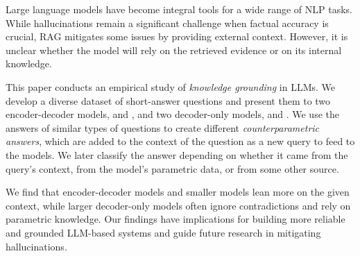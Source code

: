 Large language models have become integral tools for a wide range of NLP tasks.
While hallucinations remain a significant challenge when factual accuracy is crucial, RAG mitigates some issues by providing external context.
However, it is unclear whether the model will rely on the retrieved evidence or on its internal knowledge.

This paper conducts an empirical study of \emph{knowledge grounding} in LLMs.
We develop a diverse dataset of short-answer questions and present them to two encoder-decoder models, \smallflan{} and \bigflan{}, and two decoder-only models, \smallllama{} and \bigllama{}.
We use the answers of similar types of questions to create different \emph{counterparametric answers}, which are added to the context of the question as a new query to feed to the models.
We later classify the answer depending on whether it came from the query's context, from the model's parametric data, or from some other source.

We find that encoder-decoder models and smaller models lean more on the given context, while larger decoder-only models often ignore contradictions and rely on parametric knowledge.
Our findings have implications for building more reliable and grounded LLM-based systems and guide future research in mitigating hallucinations.

